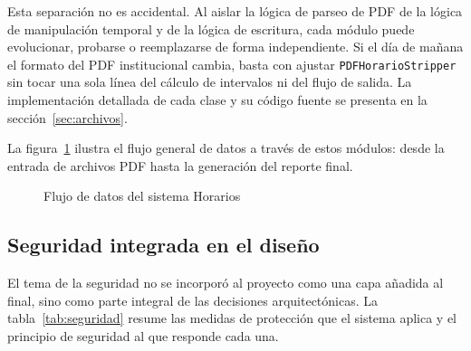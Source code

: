 Esta separación no es accidental. Al aislar la lógica de parseo de PDF de la lógica de manipulación
temporal y de la lógica de escritura, cada módulo puede evolucionar, probarse o
reemplazarse de forma independiente. Si el día de mañana el formato del PDF institucional cambia, basta con
ajustar \texttt{PDFHorarioStripper} sin tocar una sola línea del cálculo de intervalos ni del
flujo de salida. La implementación detallada de cada clase y su código fuente se presenta en la
sección~\ref{sec:archivos}.

La figura~\ref{fig:flujo} ilustra el flujo general de datos a través de estos módulos: desde la
entrada de archivos PDF hasta la generación del reporte final.

\begin{figure}[H]
\centering
\caption{Flujo de datos del sistema Horarios}
\label{fig:flujo}
\end{figure}

\subsection{Seguridad integrada en el diseño}

El tema de la seguridad no se incorporó al proyecto como una capa añadida al final, sino como
parte integral de las decisiones arquitectónicas. La tabla~\ref{tab:seguridad} resume
las medidas de protección que el sistema aplica y el principio de seguridad al que responde
cada una.

